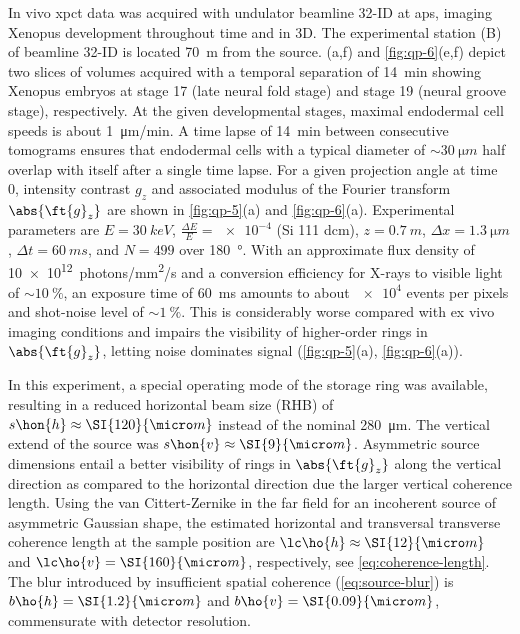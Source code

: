 \documentclass[
twoside,
openright,
titlepage,
numbers=noenddot,
headinclude,
fleqn,
a4paper,
footinclude=true,
cleardoublepage=empty,
abstractoff,
BCOR=5mm,
paper=a4,
fontsize=11pt,
british,ngerman,american,
]{scrreprt}
\begin{document}
In vivo \ac{xpct} data was acquired with undulator beamline 32-ID at
\ac{aps}, imaging Xenopus development throughout time and in 3D.  The
experimental station (B) of beamline 32-ID is located \SI{70}{m} from
the source.  (a,f) and \cref{fig:qp-6}(e,f) depict two
slices of volumes acquired with a temporal separation of \SI{14}{min}
showing Xenopus embryos at stage 17 (late neural fold stage) and stage
19 (neural groove stage), respectively.  %
At the given developmental stages, maximal endodermal cell speeds is
about \SI{1}{\micro m/min}.  A time lapse of \SI{14}{min} between
consecutive tomograms ensures that endodermal cells with a typical
diameter of $\sim\SI{30}{\micro m}$ half overlap with itself after a
single time lapse.  For a given projection angle at time 0, intensity
contrast $g_z$ and associated modulus of the Fourier transform
$\abs{\ft{g}_z}$ are shown in \cref{fig:qp-5}(a) and
\cref{fig:qp-6}(a).  Experimental parameters are $E=\SI{30}{keV}$,
$\frac{\Delta E}{E}=\num{e-4}$ (Si 111 \ac{dcm}), $z=\SI{0.7}{m}$,
$\Delta x = \SI{1.3}{\micro m}$, $\Delta t=\SI{60}{ms}$, and $N=499$
over \SI{180}{\degree}.  With an approximate flux density of
\SI{10e12}{photons/mm^2/s} and a conversion efficiency for X-rays to
visible light of $\sim\SI{10}{\percent}$, an exposure time of
\SI{60}{ms} amounts to about $\num{e4}$ events per pixels and
shot-noise level of $\sim\SI{1}{\percent}$.  This is considerably
worse compared with ex vivo imaging conditions and impairs the
visibility of higher-order rings in $\abs{\ft{g}_z}$, letting noise
dominates signal (\cref{fig:qp-5}(a), \cref{fig:qp-6}(a)).

In this experiment, a special operating mode of the storage ring was
available, resulting in a reduced horizontal beam size (RHB) of
$s\hon{h}\approx\SI{120}{\micro m}$ instead of the nominal
\SI{280}{\micro m}.  The vertical extend of the source was
$s\hon{v}\approx\SI{9}{\micro m}$.  Asymmetric source dimensions
entail a better visibility of rings in $\abs{\ft{g}_z}$ along the
vertical direction as compared to the horizontal direction due the
larger vertical coherence length.  Using the van Cittert-Zernike in
the far field for an incoherent source of asymmetric Gaussian shape,
the estimated horizontal and transversal transverse coherence length
at the sample position are $\lc\ho{h}\approx\SI{12}{\micro m}$ and
$\lc\ho{v}=\SI{160}{\micro m}$, respectively, see
\cref{eq:coherence-length}.  The blur introduced by insufficient
spatial coherence (\cref{eq:source-blur}) is $b\ho{h}=\SI{1.2}{\micro
  m}$ and $b\ho{v}=\SI{0.09}{\micro m}$, commensurate with detector
resolution.
\end{document}
